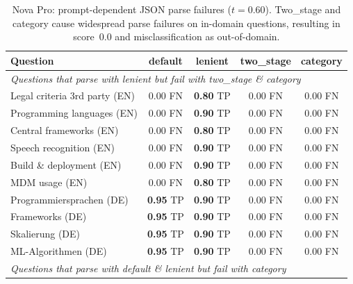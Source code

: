 \begin{table}[ht]
\centering
\caption{Nova Pro: prompt-dependent JSON parse failures ($t{=}0.60$). Two\_stage and category cause widespread parse failures on in-domain questions, resulting in score~0.0 and misclassification as out-of-domain.}
\label{tab:dj-nova-pro-json}
\small
\begin{tabular}{p{5cm}cccc}
\toprule
Question & default & lenient & two\_stage & category \\
\midrule
\multicolumn{5}{l}{\textit{Questions that parse with lenient but fail with two\_stage \& category}} \\
\midrule
Legal criteria 3rd party (EN)          & 0.00 \scriptsize{FN} & \textbf{0.80} \scriptsize{TP} & 0.00 \scriptsize{FN} & 0.00 \scriptsize{FN} \\
Programming languages (EN)             & 0.00 \scriptsize{FN} & \textbf{0.90} \scriptsize{TP} & 0.00 \scriptsize{FN} & 0.00 \scriptsize{FN} \\
Central frameworks (EN)                & 0.00 \scriptsize{FN} & \textbf{0.80} \scriptsize{TP} & 0.00 \scriptsize{FN} & 0.00 \scriptsize{FN} \\
Speech recognition (EN)                & 0.00 \scriptsize{FN} & \textbf{0.90} \scriptsize{TP} & 0.00 \scriptsize{FN} & 0.00 \scriptsize{FN} \\
Build \& deployment (EN)               & 0.00 \scriptsize{FN} & \textbf{0.90} \scriptsize{TP} & 0.00 \scriptsize{FN} & 0.00 \scriptsize{FN} \\
MDM usage (EN)                         & 0.00 \scriptsize{FN} & \textbf{0.80} \scriptsize{TP} & 0.00 \scriptsize{FN} & 0.00 \scriptsize{FN} \\
Programmiersprachen (DE)               & \textbf{0.95} \scriptsize{TP} & \textbf{0.90} \scriptsize{TP} & 0.00 \scriptsize{FN} & 0.00 \scriptsize{FN} \\
Frameworks (DE)                        & \textbf{0.95} \scriptsize{TP} & \textbf{0.90} \scriptsize{TP} & 0.00 \scriptsize{FN} & 0.00 \scriptsize{FN} \\
Skalierung (DE)                        & \textbf{0.95} \scriptsize{TP} & \textbf{0.90} \scriptsize{TP} & 0.00 \scriptsize{FN} & 0.00 \scriptsize{FN} \\
ML-Algorithmen (DE)                    & \textbf{0.95} \scriptsize{TP} & \textbf{0.90} \scriptsize{TP} & 0.00 \scriptsize{FN} & 0.00 \scriptsize{FN} \\
\midrule
\multicolumn{5}{l}{\textit{Questions that parse with default \& lenient but fail with category}} \\

\end{tabular}
\end{table}
